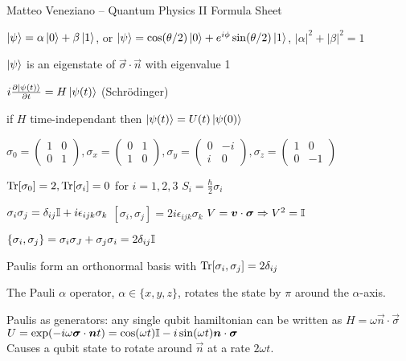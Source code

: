 Matteo Veneziano -- Quantum Physics II Formula Sheet

\begin{squishlist}
    \item $\ket{\psi} = \alpha \ket{0} + \beta \ket{1}$, or $\ket{\psi} = \cos(\theta/2)\ket{0} + e^{i\phi} \sin(\theta/2)\ket{1}$, $|\alpha|^2 + |\beta|^2 = 1$
    \item $\ket{\psi}$ is an eigenstate of $\vec{\sigma}\cdot \vec{n}$ with eigenvalue 1
\end{squishlist}

\begin{squishlist}
    \item $i \D{t}{\ket{\psi(t)}} = H \ket{\psi(t)}$ (Schrödinger)
    \item if $H$ time-independant then $\ket{\psi(t)} = U(t) \ket{\psi(0)}$
\end{squishlist}

\begin{squishlist}
    \item $\sigma_0 = \begin{pmatrix} 1 & 0\\ 0 & 1 \end{pmatrix},
        \sigma_x = \begin{pmatrix} 0 & 1 \\ 1 & 0 \end{pmatrix}, 
        \sigma_y=\begin{pmatrix} 0 & -i\\ i & 0\end{pmatrix} , 
        \sigma_z = \begin{pmatrix} 1 & 0 \\ 0 & -1\end{pmatrix}$

    \item $\Tr[\sigma_0] = 2, \Tr[\sigma_i] = 0$ for $i=1,2,3$ \hfill $S_i = \frac{\hbar}{2} \sigma_i$
    \item $\sigma_i \sigma_j = \delta_{ij} \id + i \epsilon_{ijk} \sigma_k$ \quad $[\sigma_i, \sigma_j] = 2i \epsilon_{ijk} \sigma_k$ \quad $V = \vec{v}\cdot \vec{\sigma} \Rightarrow V^2 = \id$
    \item $\{\sigma_i, \sigma_j \} = \sigma_i \sigma_J + \sigma_j\sigma_i = 2 \delta_{ij} \id$
    \item Paulis form an orthonormal basis with $\Tr[\sigma_i,\sigma_j] = 2\delta_{ij}$
    \item The Pauli $\alpha$ operator, $\alpha \in \{x,y,z\}$, rotates the state by $\pi$ around the $\alpha$-axis.

    \item Paulis as generators: any single qubit hamiltonian can be written as $H = \omega \vec{n}\cdot \vec{\sigma}$ \\
        $U = \exp(-i\omega \vec{\sigma}\cdot \vec{n} t) = \cos(\omega t) \id - i \sin(\omega t) \vec{n}\cdot\vec{\sigma}$ \\
        Causes a qubit state to rotate around $\vec{n}$ at a rate $2\omega t$.
\end{squishlist}

